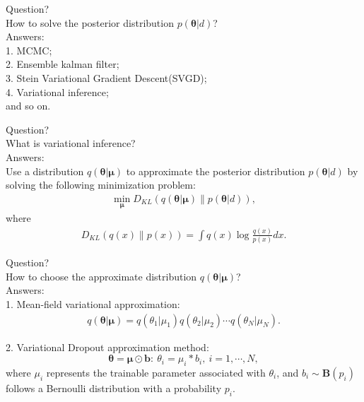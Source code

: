 \documentclass[mathserif,envcountsect,compress,8pt]{beamer}
\begin{document}
\begin{frame}
	\setlength{\parskip}{0.6\baselineskip}
	{\color{red} Question?}\\
	How to solve the posterior distribution $p(\bm{\theta}|d)$?\\
	\vspace{10pt}
	{\color{red} Answers:}\\
	1. MCMC;\\
	2. Ensemble kalman filter;\\
	3. Stein Variational Gradient Descent(SVGD);\\
	4. {\color{blue}Variational inference};\\
	and so on.
	
\end{frame}


\begin{frame}
	\setlength{\parskip}{0.6\baselineskip}
	{\color{red}Question?}\\
	What is variational inference?\\
	\vspace{10pt}
	{\color{red}Answers:}\\
	
	Use a distribution $q(\bm{\theta}|\bm{\mu})$ to approximate the posterior distribution $p(\bm{\theta}|d)$
	by solving the following minimization problem:
	\begin{align*}
		\mathop{\min}_{\bm{\mu}}D_{KL}(q(\bm{\theta}|\bm{\mu})\|p(\bm{\theta}|d)),
	\end{align*}
	where
	\begin{align*}
		D_{KL}(q(x)\|p(x)) = \int q(x)\log\frac{q(x)}{p(x)}dx.
	\end{align*}
	
\end{frame}


\begin{frame}
	\setlength{\parskip}{0.6\baselineskip}
	{\color{red}Question?}\\
	How to choose the approximate distribution $q(\bm{\theta}|\bm{\mu})$?\\
	\vspace{10pt}
	{\color{red}Answers:}\\
	
	1. Mean-field variational approximation:
	\begin{align*}
		q(\bm{\theta}|\bm{\mu})=q(\theta_1|\mu_1)q(\theta_2|\mu_2)\cdots q(\theta_N|\mu_N).
	\end{align*}
	
	2. {\color{blue}Variational Dropout approximation method:}
	\begin{equation*}\label{3.2.2}
		\bm{\theta}=\bm{\mu}\odot \bm{b}:~\theta_{i}=\mu_{i}*b_{i},~i=1,\cdots,N,
	\end{equation*}
	where $\mu_i$ represents the trainable parameter associated
	with $\theta_i$, and $b_i\sim \bm{B}(p_i)$ follows a Bernoulli
	distribution with a probability $p_i$.
\end{frame}
\end{document}

